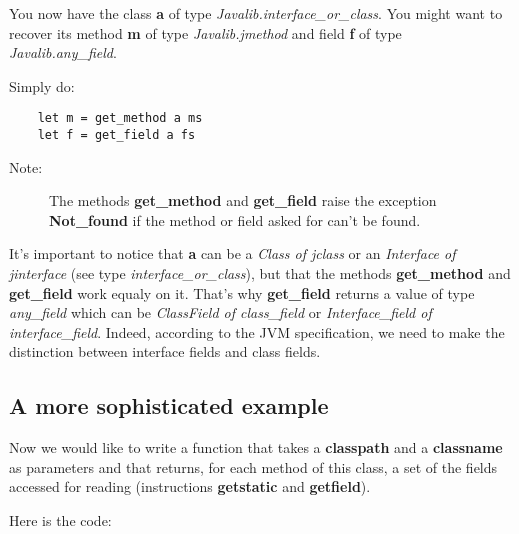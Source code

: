 \documentclass{article}
\begin{document}
You now have the class \textbf{a} of type
\emph{Javalib.interface\_or\_class}. You might want to recover its
method \textbf{m} of type \emph{Javalib.jmethod} and field
\textbf{f} of type \emph{Javalib.any\_field}.

Simply do:

\begin{verbatim}
    let m = get_method a ms
    let f = get_field a fs
\end{verbatim}
\begin{description}
\item[Note:]
The methods \textbf{get\_method} and \textbf{get\_field} raise the
exception \textbf{Not\_found} if the method or field asked for
can't be found.
\end{description}
It's important to notice that \textbf{a} can be a
\emph{Class of jclass} or an \emph{Interface of jinterface} (see
type \emph{interface\_or\_class}), but that the methods
\textbf{get\_method} and \textbf{get\_field} work equaly on it.
That's why \textbf{get\_field} returns a value of type
\emph{any\_field} which can be \emph{ClassField of class\_field} or
\emph{Interface\_field of interface\_field}. Indeed, according to
the JVM specification, we need to make the distinction between
interface fields and class fields.

\subsection{A more sophisticated example}

Now we would like to write a function that takes a
\textbf{classpath} and a \textbf{classname} as parameters and that
returns, for each method of this class, a set of the fields
accessed for reading (instructions \textbf{getstatic} and
\textbf{getfield}).

Here is the code:
\end{document}
